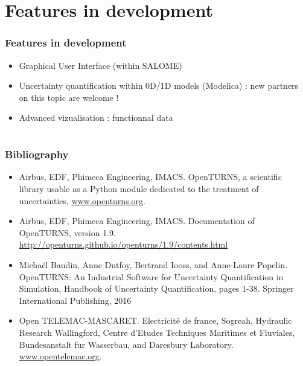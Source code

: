 \documentclass{beamer}
\begin{document}
\section{Features in development}

\begin{frame}[containsverbatim]
\frametitle{Features in development}

\begin{itemize}
\item Graphical User Interface (within SALOME)

\item Uncertainty quantification within 0D/1D models (Modelica) : 
new partners on this topic are welcome !

\item Advanced vizualisation : functionnal data
\end{itemize}

\end{frame}

\section{}

\begin{frame}
\frametitle{Bibliography}

\begin{itemize}
\item Airbus, EDF, Phimeca Engineering, IMACS. 
OpenTURNS, a scientific library usable as a Python module dedicated to the treatment of uncertainties, 
\url{www.openturns.org}.
\item Airbus, EDF, Phimeca Engineering, IMACS. Documentation of OpenTURNS, version 1.9. 
\url{http://openturns.github.io/openturns/1.9/contents.html}
\item  Michaël Baudin, Anne Dutfoy, Bertrand Iooss, and Anne-Laure Popelin. 
OpenTURNS: An Industrial Software for Uncertainty Quantification in Simulation, 
Handbook of Uncertainty Quantification, 
pages 1-38. Springer International Publishing, 2016
\item Open TELEMAC-MASCARET. 
Electricité de france, Sogreah, Hydraulic Research Wallingford, 
Centre d'Etudes Techniques Maritimes et Fluviales, Bundesanstalt fur Wasserbau, and Daresbury Laboratory.
\url{www.opentelemac.org}.
\end{itemize}

\end{frame}
\end{document}
